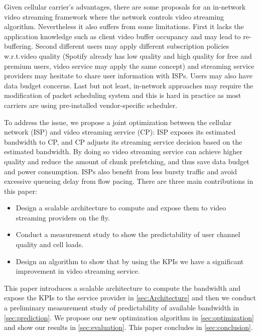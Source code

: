 Given cellular carrier's advantages, there are some proposals\cite{Avis} for an in-network video streaming framework where the network controls video streaming algorithm. 
Nevertheless it also suffers from some limitations. First it
lacks the application knowledge such as client video buffer occupancy and may lead to re-buffering. 
Second different users may apply different subscription
policies w.r.t.video quality (Spotify already has low quality and high quality for free and premium users, video service may apply the same concept) and streaming service providers may
hesitate to share user information with ISPs. Users may also have data budget concerns. Last
but not least, in-network approaches may require the modification of packet scheduling system and this
is hard in practice as most carriers are using pre-installed
vendor-specific scheduler. 

To address the issue, we propose a joint optimization between the cellular network (ISP) and video streaming service (CP): ISP exposes its estimated bandwidth to CP, and CP adjusts its streaming service decision based on the estimated bandwidth. By doing so video streaming service can achieve higher quality and reduce the amount of chunk prefetching, and thus save data budget and power consumption. ISPs also benefit from less bursty traffic and avoid excessive queueing delay from flow pacing. There are three main contributions in this paper:
\begin{itemize}
\item Design a scalable architecture to compute  and expose them to video streaming providers on the fly.
\item Conduct a measurement study to show the predictability of user channel quality and cell loads. 
\item Design an algorithm to show that by using the KPIs we have a significant improvement in video streaming service.
\end{itemize}

This paper introduces a scalable architecture to compute the bandwidth and expose the KPIs to the service provider in \autoref{sec:Architecture} and then we conduct a preliminary measurement study of predictability of available bandwidth in \autoref{sec:prediction}. We propose our new optimization algorithm in \autoref{sec:optimization} and show our results in \autoref{sec:evaluation}. This paper concludes in \autoref{sec:conclusion}. 


